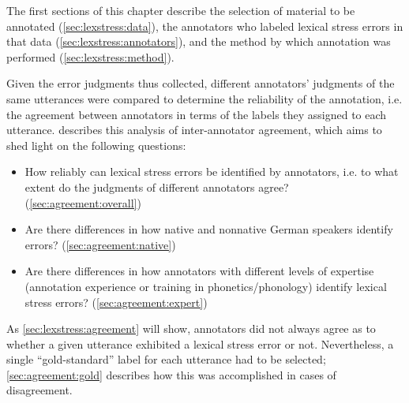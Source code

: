 	
	The first sections of this chapter describe the selection of material to be annotated (\cref{sec:lexstress:data}), the annotators who labeled lexical stress errors in that data (\cref{sec:lexstress:annotators}), and the method by which annotation was performed (\cref{sec:lexstress:method}). 
	
	Given the error judgments thus collected, 
	different annotators' judgments of the same utterances were compared to determine the reliability of the annotation, i.e. the agreement between annotators in terms of the labels they assigned to each utterance.
	 describes this analysis of inter-annotator agreement, which aims to shed light on the following questions:
	\begin{itemize}[topsep=-1em]
	\item{How reliably can lexical stress errors be identified by
	annotators, i.e. to what extent do the judgments of different annotators agree?  (\cref{sec:agreement:overall})}
	\item{Are there differences in how native and nonnative German speakers identify errors?  (\cref{sec:agreement:native})}
	\item{Are there differences in how 
	annotators with different levels of expertise
	(annotation experience or training in phonetics/phonology) identify lexical stress errors?  (\cref{sec:agreement:expert})} 
	\end{itemize}
	As \cref{sec:lexstress:agreement} will show, annotators did not always agree as to whether a given utterance exhibited a lexical stress error or not. Nevertheless, a single ``gold-standard'' label for each utterance had to be selected; \cref{sec:agreement:gold} describes how this was accomplished in cases of disagreement.
	
